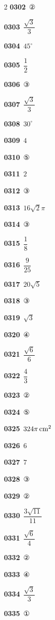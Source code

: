 \documentclass[10pt,a4paper]{article}
\begin{document}
\begin{multicols}{2}
\noindent\textbf{0302}\ ②\par
\noindent\textbf{0303}\ $\dfrac{\sqrt{3}}{3}$\par
\noindent\textbf{0304}\ $45^\circ$\par
\noindent\textbf{0305}\ $\dfrac{1}{2}$\par
\noindent\textbf{0306}\ ③\par
\noindent\textbf{0307}\ $\dfrac{\sqrt{3}}{3}$\par
\noindent\textbf{0308}\ $30^\circ$\par
\noindent\textbf{0309}\ $4$\par
\noindent\textbf{0310}\ ⑤\par
\noindent\textbf{0311}\ $2$\par
\noindent\textbf{0312}\ ③\par
\noindent\textbf{0313}\ $16\sqrt{2}\pi$\par
\noindent\textbf{0314}\ ③\par
\noindent\textbf{0315}\ $\dfrac{1}{8}$\par
\noindent\textbf{0316}\ $\dfrac{9}{25}$\par
\noindent\textbf{0317}\ $20\sqrt{5}$\par
\noindent\textbf{0318}\ ③\par
\noindent\textbf{0319}\ $\sqrt{3}$\par
\noindent\textbf{0320}\ ④\par
\noindent\textbf{0321}\ $\dfrac{\sqrt{6}}{6}$\par
\noindent\textbf{0322}\ $\dfrac{4}{3}$\par
\noindent\textbf{0323}\ ②\par
\noindent\textbf{0324}\ ⑤\par
\noindent\textbf{0325}\ $324\pi\mkern3mu \mathrm{cm}^2$\par
\noindent\textbf{0326}\ $6$\par
\noindent\textbf{0327}\ $7$\par
\noindent\textbf{0328}\ ③\par
\noindent\textbf{0329}\ ②\par
\noindent\textbf{0330}\ $\dfrac{3\sqrt{11}}{11}$\par
\noindent\textbf{0331}\ $\dfrac{\sqrt{6}}{4}$\par
\noindent\textbf{0332}\ ②\par
\noindent\textbf{0333}\ ④\par
\noindent\textbf{0334}\ $\dfrac{\sqrt{3}}{3}$\par
\noindent\textbf{0335}\ ①\par

\end{multicols}
\end{document}
